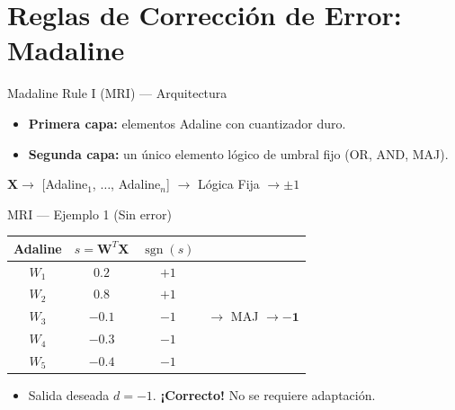\documentclass[aspectratio=169,utf8,spanish]{beamer}
\DeclareMathOperator{\sgn}{sgn}
\begin{document}
\section{Reglas de Corrección de Error: Madaline}

\begin{frame}{Madaline Rule I (MRI) — Arquitectura}
  \begin{itemize}
    \item \textbf{Primera capa:} elementos Adaline con cuantizador duro.
    \item \textbf{Segunda capa:} un único elemento lógico de umbral fijo (OR, AND, MAJ).
  \end{itemize}
  \begin{center}
    $\mathbf{X} \to$ [Adaline$_1$, $\ldots$, Adaline$_n$] $\to$ Lógica Fija $\to \pm 1$
  \end{center}
\end{frame}

\begin{frame}{MRI — Ejemplo 1 (Sin error)}
  \begin{center}
    \begin{tabular}{c|c|c|c}
      Adaline & $s = \mathbf{W}^T\mathbf{X}$ & $\sgn(s)$ & \\
      \hline
      $W_1$ & $0.2$ & $+1$ & \\
      $W_2$ & $0.8$ & $+1$ & \\
      $W_3$ & $-0.1$ & $-1$ & $\to$ MAJ $\to \mathbf{-1}$ \\
      $W_4$ & $-0.3$ & $-1$ & \\
      $W_5$ & $-0.4$ & $-1$ & \\
    \end{tabular}
  \end{center}
  \begin{itemize}
    \item Salida deseada $d = -1$. \textbf{¡Correcto!} No se requiere adaptación.
  \end{itemize}
\end{frame}
\end{document}
